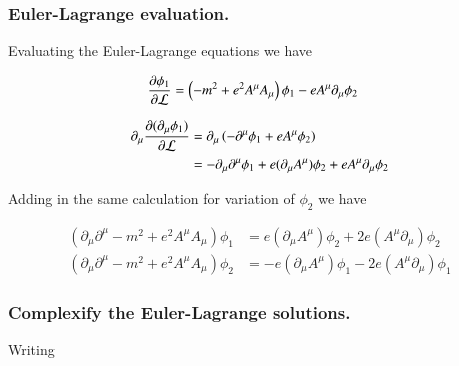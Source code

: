 \documentclass{article}
\begin{document}

\subsubsection{ Euler-Lagrange evaluation. }

Evaluating the Euler-Lagrange equations we have

\begin{align*}
\frac{\partial{\phi_1}}{\partial {\mathcal{L}}} &= \left( -m^2 + e^2 A^\mu A_\mu \right) \phi_1 - e A^\mu \partial_\mu \phi_2 
\end{align*}

\begin{align*}
\partial_\mu \frac{\partial{(\partial_\mu \phi_1)}}{\partial {\mathcal{L}}} 
&=
\partial_\mu \left( -\partial^\mu \phi_1 + e A^\mu \phi_2 \right) \\
&=
-\partial_\mu \partial^\mu \phi_1 
+ e (\partial_\mu A^\mu) \phi_2 
+ e A^\mu \partial_\mu \phi_2 
\\
\end{align*}

Adding in the same calculation for variation of $\phi_2$ we have

\begin{align*}
\left( \partial_\mu \partial^\mu -m^2 + e^2 A^\mu A_\mu \right) \phi_1 &= e (\partial_\mu A^\mu) \phi_2 + 2 e (A^\mu \partial_\mu) \phi_2  \\
\left( \partial_\mu \partial^\mu -m^2 + e^2 A^\mu A_\mu \right) \phi_2 &= -e (\partial_\mu A^\mu) \phi_1 - 2 e (A^\mu \partial_\mu) \phi_1 
\end{align*}

%
\subsubsection{ Complexify the Euler-Lagrange solutions. }

Writing
\end{document}

